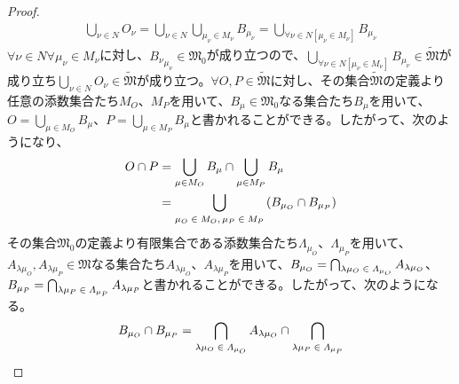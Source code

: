 \documentclass[dvipdfmx]{jsarticle}
\begin{document}
\begin{proof}
\begin{align*}
\bigcup_{\nu \in N} O_{\nu} = \bigcup_{\nu \in N} {\bigcup_{\mu_{\nu} \in M_{\nu}} B_{\mu_{\nu}}} = \bigcup_{\forall\nu \in N\left[ \mu_{\nu} \in M_{\nu} \right]} B_{\mu_{\nu}}
\end{align*}
$\forall\nu \in N\forall\mu_{\nu} \in M_{\nu}$に対し、${B_{\nu}}_{\mu_{\nu}} \in \mathfrak{M}_{0}$が成り立つので、$\bigcup_{\forall\nu \in N\left[ \mu_{\nu} \in M_{\nu} \right]} B_{\mu_{\nu}} \in \widetilde{\mathfrak{M}}$が成り立ち$\bigcup_{\nu \in N} O_{\nu} \in \widetilde{\mathfrak{M}}$が成り立つ。$\forall O,P \in \widetilde{\mathfrak{M}}$に対し、その集合$\widetilde{\mathfrak{M}}$の定義より任意の添数集合たち$M_{O}$、$M_{P}$を用いて、$B_{\mu} \in \mathfrak{M}_{0}$なる集合たち$B_{\mu}$を用いて、$O = \bigcup_{\mu \in M_{O}} B_{\mu}$、$P = \bigcup_{\mu \in M_{P}} B_{\mu}$と書かれることができる。したがって、次のようになり、
\begin{align*}
O \cap P &= \bigcup_{\mu \in M_{O}} B_{\mu} \cap \bigcup_{\mu \in M_{P}} B_{\mu}\\
&= \bigcup_{\scriptsize \begin{matrix}
\mu_{O} \in M_{O},\mu_{P} \in M_{P} \\
\end{matrix}} \left( B_{\mu_{O}} \cap B_{\mu_{P}} \right)
\end{align*}
その集合$\mathfrak{M}_{0}$の定義より有限集合である添数集合たち$\varLambda_{\mu_{O}}$、$\varLambda_{\mu_{P}}$を用いて、$A_{\lambda\mu_{O}},A_{\lambda\mu_{P}}\in \mathfrak{M}$なる集合たち$A_{\lambda\mu_{O}}$、$A_{\lambda\mu_{P}}$を用いて、$B_{\mu_{O}} = \bigcap_{\scriptsize \begin{matrix}
\lambda\mu_{O} \in \varLambda_{\mu_{O}} \\
\end{matrix}} A_{\lambda\mu_{O}}$、$B_{\mu_{P}} = \bigcap_{\scriptsize \begin{matrix}
\lambda\mu_{P} \in \varLambda_{\mu_{P}} \\
\end{matrix}} A_{\lambda\mu_{P}}$と書かれることができる。したがって、次のようになる。
\begin{align*}
B_{\mu_{O}} \cap B_{\mu_{P}} = \bigcap_{\scriptsize \begin{matrix}
\lambda\mu_{O} \in \varLambda_{\mu_{O}} \\
\end{matrix}} A_{\lambda\mu_{O}} \cap \bigcap_{\scriptsize \begin{matrix}
\lambda\mu_{P} \in \varLambda_{\mu_{P}} \\

\end{matrix}}
\end{align*}
\end{proof}
\end{document}
